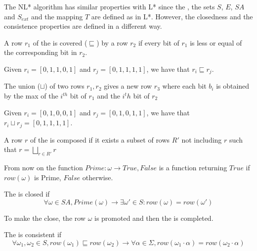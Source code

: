 The NL* algorithm has similar properties with L* since the \OT, the sets $S$, $E$, $SA$ and $S_{ext}$ and the mapping $T$ are defined as in L*. However, the closedness and the consistence properties are defined in a different way.

\begin{definition}
  \label{def:row-covering}
  A row $r_1$ of the \OT is covered ($\sqsubseteq$) by a row $r_2$ if every bit of $r_1$ is less or equal of the corresponding bit in $r_2$.
\end{definition}

\begin{example}
  Given $r_i = [0,1,1,0,1]$ and $r_j = [0,1,1,1,1]$, we have that $r_i \sqsubseteq r_j$.
\end{example}

\begin{definition}
  \label{def:row-union}
  The union ($\sqcup$) of two rows $r_1, r_2$ gives a new row $r_3$ where each bit $b_i$ is obtained by the max of the $i^{th}$ bit of $r_1$ and the $i^th$ bit of $r_2$
\end{definition}

\begin{example}
  Given $r_i = [0,1,0,0,1]$ and $r_j = [0,1,0,1,1]$, we have that $r_i \sqcup r_j = [0,1,1,1,1]$.
\end{example}

\begin{definition}
  A row $r$ of the \OT is composed if it exists a subset of rows $R'$ not including $r$ such that $r = \bigsqcup\limits_{r \in R'}r$
\end{definition}

\begin{notation}
  From now on the function $Prime: \omega \rightarrow {True, False}$ is a function returning $True$ if $row(\omega)$ is Prime, $False$ otherwise.
\end{notation}

\begin{definition}[Closedness]
  The \OT is closed if
  \[\forall \omega \in SA, Prime(\omega) \rightarrow \exists \omega' \in S: row(\omega) = row(\omega')\]
\end{definition}

To make the \OT close, the row $\omega$ is promoted and then the \OT is completed.

\begin{definition}[Consistence]
  The \OT is consistent if
  \[
    \forall \omega_1, \omega_2 \in S,
    row(\omega_1) \sqsubseteq row( \omega_2) \rightarrow
    \forall \alpha \in \Sigma,
    row(\omega_1 \cdot \alpha) = row(\omega_2 \cdot \alpha)
  \]
\end{definition}


